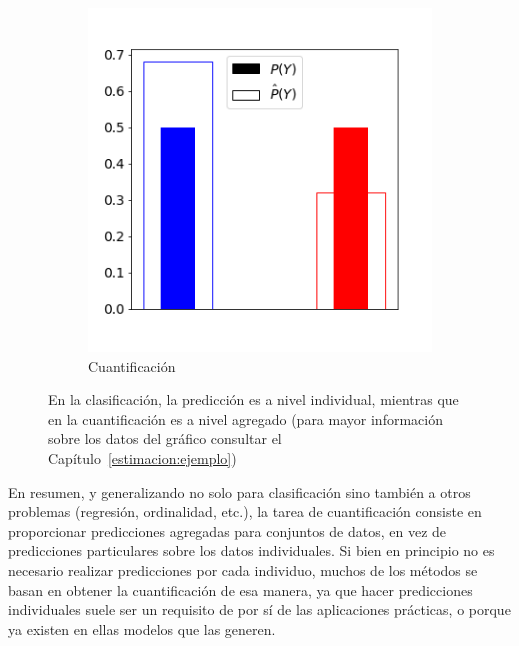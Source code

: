 \begin{figure}[H]
\begin{subfigure}[t]{0.4\textwidth}
        \includegraphics[width=\textwidth]{../plots_teoria/intro_barplot.png}
        \caption{Cuantificación}
    \end{subfigure}
    \caption{En la clasificación, la predicción es a nivel individual, mientras
    que en la cuantificación es a nivel agregado (para mayor información sobre
    los datos del gráfico consultar el
    Capítulo~\ref{estimacion:ejemplo})}\label{fig:intro}
\end{figure}

En resumen, y generalizando no solo para clasificación sino también a otros
problemas (regresión, ordinalidad, etc.), la tarea de cuantificación consiste en
proporcionar predicciones agregadas para conjuntos de datos, en vez de
predicciones particulares sobre los datos individuales. Si bien en principio no
es necesario realizar predicciones por cada individuo, muchos de los métodos se
basan en obtener la cuantificación de esa manera, ya que hacer predicciones
individuales suele ser un requisito de por sí de las aplicaciones prácticas, o
porque ya existen en ellas modelos que las generen.

